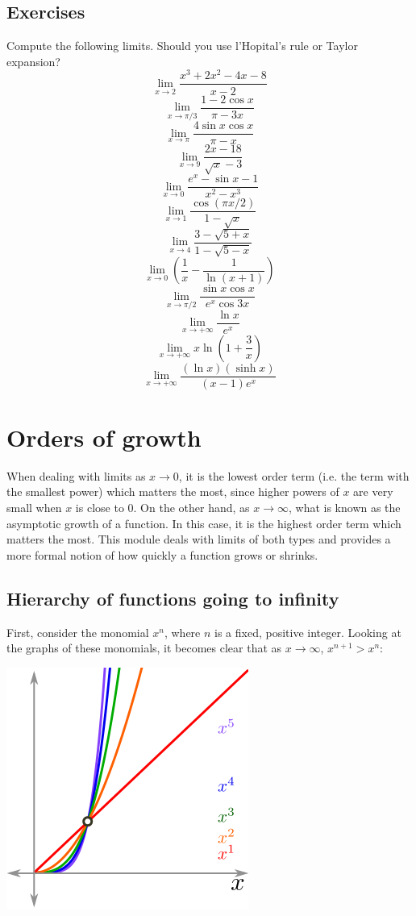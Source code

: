 \documentclass[twoside,openright,titlepage,a4paper]{book}
\begin{document}
\begin{sloppypar}
\subsection{Exercises}
Compute the following limits. Should you use l'Hopital's rule or Taylor expansion?
\[\displaystyle \lim_{x \to 2} \frac{x^3+2x^2-4x-8}{x-2} \]
\[\displaystyle \lim_{x \to \pi/3} \frac{1-2\cos x}{\pi -3x} \]
\[\displaystyle \lim_{x \to \pi} \frac{4 \sin x \cos x}{\pi - x} \]
\[\displaystyle \lim_{x \to 9} \frac{2x-18}{\sqrt{x}-3} \]
\[\displaystyle \lim_{x \to 0} \frac{e^x - \sin x -1}{x^2-x^3} \]
\[\displaystyle \lim_{x \to 1} \frac{\cos (\pi x/2)}{1 - \sqrt{x}} \]
\[\displaystyle \lim_{x \to 4} \frac{3 - \sqrt{5+x}}{1 - \sqrt{5-x}} \]
\[\displaystyle \lim_{x\rightarrow 0} \left(\frac{1}{x}-\frac{1}{\ln (x+1)}\right) \]
\[\displaystyle \lim_{x \to \pi/2} \frac{\sin x \cos x}{e^x\cos 3x} \]
\[\displaystyle \lim_{x \rightarrow +\infty} \frac {\ln x}{e^x} \]
\[\displaystyle \lim_{x \to +\infty} x \ln\left(1+ \frac{3}{x}\right) \]
\[\displaystyle \lim_{x \to +\infty} \frac{(\ln x)(\sinh x)}{(x-1)e^x} \]

\section{Orders of growth} \label{ChFunctionsSecOrdersOfGrowth}
When dealing with limits as $x\rightarrow 0$, it is the lowest order term (i.e. the term with the smallest power) which matters the most, since higher powers of $x$ are very small when $x$ is close to 0. On the other hand, as $x \rightarrow \infty$, what is known as the asymptotic growth of a function. In this case, it is the highest order term which matters the most. This module deals with limits of both types and provides a more formal notion of how quickly a function grows or shrinks.

\subsection{Hierarchy of functions going to infinity}
First, consider the monomial $x^n$, where $n$ is a fixed, positive integer. Looking at the graphs of these monomials, it becomes clear that as $x \rightarrow \infty$, $x^{n+1} > x^n$:

\begin{center}\includegraphics[scale=0.6]{AsymptoticMonomial}\end{center}


\end{sloppypar}
\end{document}
